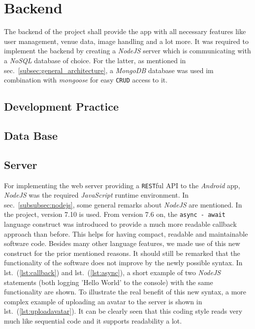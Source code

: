 \section{Backend}
\label{sec:backend}
The backend of the project shall provide the app with all necessary features like user management, venue data, image handling and a lot more. It was required to implement the backend by creating a \textit{NodeJS} server which is communicating with a \textit{NoSQL} database of choice. For the latter, as mentioned in sec.\ \ref{subsec:general_architecture}, a \textit{MongoDB} database was used im combination with \textit{mongoose} for easy \texttt{CRUD} access to it. 

\subsection{Development Practice}
\label{subsec:developmentpractice}

\subsection{Data Base}
\label{subsec:database}


\subsection{Server}
\label{subsec:server}
For implementing the web server providing a \texttt{REST}ful API to the \textit{Android} app, \textit{NodeJS} was the required \textit{JavaScript} runtime environment. In sec.\ \ref{subsubsec:nodejs}, some general remarks about \textit{NodeJS} are mentioned. In the project, version 7.10 is used. From version 7.6 on, the \texttt{async - await} language construct was introduced to provide a much more readable callback approach than before. This helps for having compact, readable and maintainable software code. Besides many other language features, we made use of this new construct for the prior mentioned reasons. It should still be remarked that the functionality of the software does not improve by the newly possible syntax. In lst.\ (\ref{lst:callback}) and lst.\ (\ref{lst:async}), a short example of two \textit{NodeJS} statements (both logging 'Hello World' to the console) with the same functionality are shown. To illustrate the real benefit of this new syntax, a more complex example of uploading an avatar to the server is shown in lst.\ (\ref{lst:uploadavatar}). It can be clearly seen that this coding style reads very much like sequential code and it supports readability a lot.

